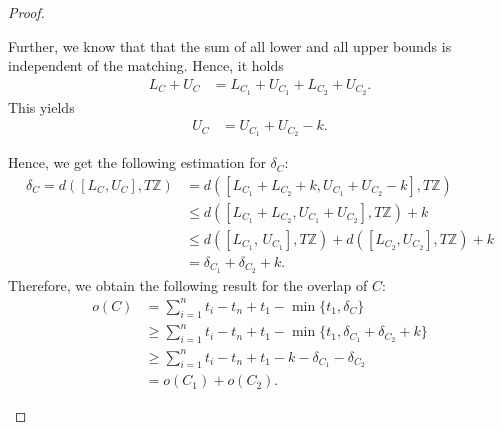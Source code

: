 \documentclass[10pt,a4paper]{amsart}
\newcommand{\Z}{\mathbb Z}
\begin{document}
\begin{proof}
\begin{itemize}
        Further, we know that that the sum of all lower and all upper bounds is independent of the matching. Hence, it holds
        \begin{align*}
            L_C + U_C &= L_{C_1} + U_{C_1} + L_{C_2} + U_{C_2}.
        \end{align*}
This yields
\begin{align*}
            U_C &= U_{C_1} + U_{C_2} - k.
        \end{align*}

        Hence, we get the following estimation for $\delta_C$:
        \begin{align*}
         \delta_C = d([L_C, U_C], T\Z) &=  d([L_{C_1} + L_{C_2} + k, U_{C_1} + U_{C_2} - k], T\Z) \\ 
        &\leq 
        d([L_{C_1} + L_{C_2}, U_{C_1} + U_{C_2}], T\Z) + k \\ 
        &\le  d([L_{C_1},\, U_{C_1}], T\Z) + d([L_{C_2}, U_{C_2}], T\Z) + k
        \\
        &= \delta_{C_1} + \delta_{C_2} + k.
        \end{align*}
		Therefore, we obtain the following result for the overlap of $C$:
		\begin{align*}
        o(C) &= \sum_{i=1}^{n} t_i - t_n + t_1 - \min\{t_1, \delta_C\}\\
        &\geq \sum_{i=1}^{n} t_i - t_n + t_1 - \min\{t_1, \delta_{C_1} + \delta_{C_2} + k\}\\
        &\geq \sum_{i=1}^{n} t_i - t_n + t_1  - k - \delta_{C_1} - \delta_{C_2} \\
        &= o(C_1) + o(C_2).
		\end{align*}
	\end{itemize}
\end{proof}
\end{document}
